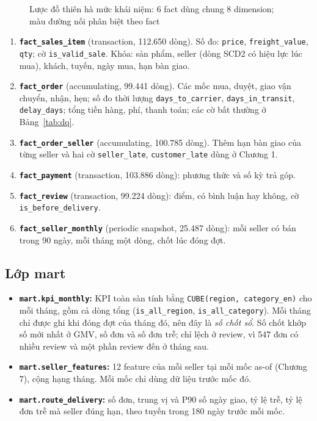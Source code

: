 \begin{figure}[htbp]
\centering
\resizebox{\textwidth}{!}{}
\caption{Lược đồ thiên hà mức khái niệm: 6 fact dùng chung 8 dimension; màu đường nối phân biệt theo fact}
\label{fig:galaxy}
\end{figure}

\begin{enumerate}
    \item \textbf{\texttt{fact\_sales\_item}} (transaction, 112.650 dòng). Số đo: \texttt{price}, \texttt{freight\_value}, \texttt{qty}; cờ \texttt{is\_valid\_sale}. Khóa: sản phẩm, seller (dòng SCD2 có hiệu lực lúc mua), khách, tuyến, ngày mua, hạn bàn giao.
    \item \textbf{\texttt{fact\_order}} (accumulating, 99.441 dòng). Các mốc mua, duyệt, giao vận chuyển, nhận, hẹn; số đo thời lượng \texttt{days\_to\_carrier}, \texttt{days\_in\_transit}, \texttt{delay\_days}; tổng tiền hàng, phí, thanh toán; các cờ bất thường ở Bảng~\ref{tab:dq}.
    \item \textbf{\texttt{fact\_order\_seller}} (accumulating, 100.785 dòng). Thêm hạn bàn giao của từng seller và hai cờ \texttt{seller\_late}, \texttt{customer\_late} dùng ở Chương 1.
    \item \textbf{\texttt{fact\_payment}} (transaction, 103.886 dòng): phương thức và số kỳ trả góp.
    \item \textbf{\texttt{fact\_}\allowbreak\texttt{review}} (transaction, 99.224 dòng): điểm, có bình luận hay không, cờ \texttt{is\_before\_delivery}.
    \item \textbf{\texttt{fact\_seller\_monthly}} (periodic snapshot, 25.487 dòng): mỗi seller có bán trong 90 ngày, mỗi tháng một dòng, chốt lúc đóng đợt.
\end{enumerate}

\subsection{Lớp mart}
\begin{itemize}
    \item \textbf{\texttt{mart.kpi\_monthly}:} KPI toàn sàn tính bằng \texttt{CUBE(region, category\_en)} cho mỗi tháng, gồm cả dòng tổng (\texttt{is\_all\_region}, \texttt{is\_all\_category}). Mỗi tháng chỉ được ghi khi đóng đợt của tháng đó, nên đây là \emph{số chốt sổ}. Số chốt khớp số mới nhất ở GMV, số đơn và số đơn trễ; chỉ lệch ở review, vì 547 đơn có nhiều review và một phần review đến ở tháng sau.
    \item \textbf{\texttt{mart.seller\_features}:} 12 feature của mỗi seller tại mỗi mốc as-of (Chương 7), cộng hạng tháng. Mỗi mốc chỉ dùng dữ liệu trước mốc đó.
    \item \textbf{\texttt{mart.route\_delivery}:} số đơn, trung vị và P90 số ngày giao, tỷ lệ trễ, tỷ lệ đơn trễ mà seller đúng hạn, theo tuyến trong 180 ngày trước mỗi mốc.
\end{itemize}

